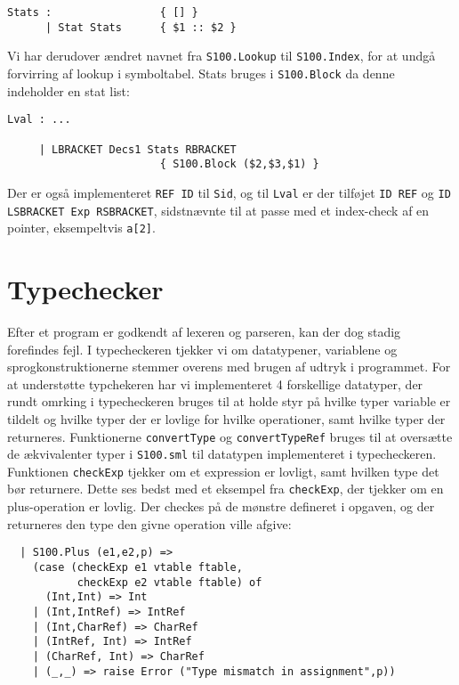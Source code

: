 \documentclass[12pt]{article}
\begin{document}
\begin{verbatim}
Stats :                 { [] }
      | Stat Stats      { $1 :: $2 }
\end{verbatim}

Vi har derudover ændret navnet fra \texttt{S100.Lookup} til \texttt{S100.Index},
for at undgå forvirring af lookup i symboltabel. Stats bruges i
    \texttt{S100.Block} da denne indeholder en stat list:\\

\begin{verbatim}
Lval : ...

     | LBRACKET Decs1 Stats RBRACKET
                        { S100.Block ($2,$3,$1) }
\end{verbatim}

Der er også implementeret \texttt{REF ID} til \texttt{Sid}, og til \texttt{Lval}
er der tilføjet \texttt{ID REF} og \texttt{ID LSBRACKET Exp RSBRACKET},
sidstnævnte til at passe med et index-check af en pointer, eksempeltvis
\texttt{a[2]}.

\section{Typechecker}
Efter et program er godkendt af lexeren og parseren, kan der dog stadig forefindes fejl. I typecheckeren tjekker vi om datatypener, variablene og sprogkonstruktionerne stemmer overens med brugen af udtryk i programmet. For at understøtte typchekeren har vi implementeret 4 forskellige datatyper, der rundt omrking i typecheckeren bruges til at holde styr på hvilke typer variable er tildelt og hvilke typer der er lovlige for hvilke operationer, samt hvilke typer der returneres. Funktionerne \texttt{convertType} og \texttt{convertTypeRef} bruges til at oversætte de ækvivalenter typer i \texttt{S100.sml} til datatypen implementeret i typecheckeren. \\
Funktionen \texttt{checkExp} tjekker om et expression er lovligt, samt hvilken type det bør returnere. Dette ses bedst med et eksempel fra \texttt{checkExp}, der tjekker om en plus-operation er lovlig. Der checkes på de mønstre defineret i opgaven, og der returneres den type den givne operation ville afgive:\\

\begin{verbatim}
  | S100.Plus (e1,e2,p) =>
    (case (checkExp e1 vtable ftable,
           checkExp e2 vtable ftable) of
      (Int,Int) => Int
    | (Int,IntRef) => IntRef
    | (Int,CharRef) => CharRef
    | (IntRef, Int) => IntRef
    | (CharRef, Int) => CharRef
    | (_,_) => raise Error ("Type mismatch in assignment",p))
\end{verbatim}
\end{document}
